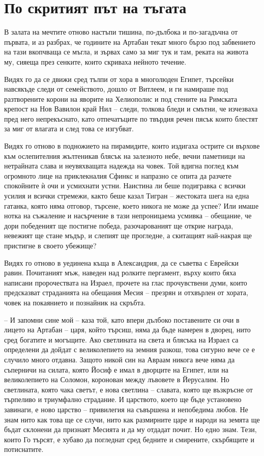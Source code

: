 \part{По скритият път на тъгата}

В залата на мечтите отново настъпи тишина, по-дълбока и по-загадъчна от първата,
и аз разбрах, че годините на Артабан текат много бързо под забвението на тази
вкопчваща се мъгла, и зървах само за миг тук и там, реката на живота му, сияеща
през сенките, които скриваха нейното течение.

Видях го да се движи сред тълпи от хора в многолюден Египет, търсейки навсякъде
следи от семейството, дошло от Витлеем, и ги намираше под разтворените корони на
яворите на Хелиополис и под стените на Римската крепост на Нов Вавилон край Нил
-- следи, толкова бледи и смътни, че изчезваха пред него непрекъснато, като
отпечатъците по твърдия речен пясък които блестят за миг от влагата и след това
се изгубват.

Видях го отново в подножието на пирамидите, които издигаха острите си върхове
към ослепителния жълтеникав блясък на залезното небе, вечни паметници на
нетрайната слава и неувяхващата надежда на човек. Той вдигна поглед към
огромното лице на приклекналия Сфинкс и напразно се опита да разчете спокойните
ѝ очи и усмихнати устни. Наистина ли беше подигравка с всички усилия и всички
стремежи, както беше казал Тигран -- жестоката шега на една гатанка, която няма
отговор, търсене, което никога не може да успее? Или имаше нотка на съжаление и
насърчение в тази непроницаема усмивка -- обещание, че дори победеният ще
постигне победа, разочарованият ще открие награда, невежият ще стане мъдър, и
слепият ще прогледне, а скитащият най-накрая ще пристигне в своето убежище?

Видях го отново в уединена къща в Александрия, да се съветва с Еврейски равин.
Почитаният мъж, наведен над ролките пергамент, върху които бяха написани
пророчествата на Израел, прочете на глас прочувствени думи, които предсказват
страданията на обещания Месия -- презрян и отхвърлен от хората, човек на
покаянието и познайник на скръбта.

-- И запомни сине мой -- каза той, като впери дълбоко поставените си очи в
лицето на Артабан -- царя, който търсиш, няма да бъде намерен в дворец, нито
сред богатите и могъщите. Ако светлината на света и блясъка на Израел са
определени да дойдат с великолепието на земния разкош, това сигурно вече се е
случило много отдавна. Защото никой син на Авраам никога вече няма да съперничи
на силата, която Йосиф е имал в дворците на Египет, или на великолепието на
Соломон, коронован между лъвовете в Йерусалим. Но светлината, която чака светът,
е нова светлина -- славата, която ще възкръсне от търпеливо и триумфално
страдание. И царството, което ще бъде установено завинаги, е ново царство --
привилегия на съвършена и непобедима любов. Не знам нито как това ще се случи,
нито как размирните царе и народи на земята ще бъдат склонени да признаят
Месията и да му отдадат почит. Но едно знам. Тези, които Го търсят, е хубаво да
погледнат сред бедните и смирените, скърбящите и потиснатите.

